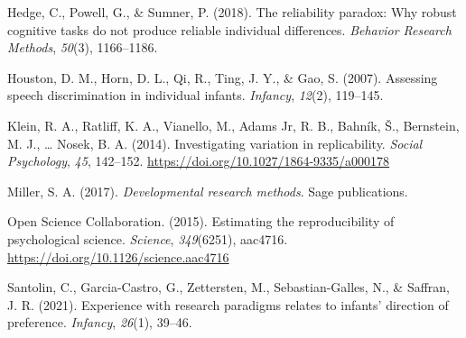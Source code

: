 \documentclass[
  english,
  man,floatsintext]{apa6}
\newlength{\cslhangindent}
\newlength{\cslentryspacingunit} %
\newenvironment{CSLReferences}[2] %
 {%
  \setlength{\parindent}{0pt}
  \ifodd #1
  \let\oldpar\par
  \def\par{\hangindent=\cslhangindent\oldpar}
  \fi
  \setlength{\parskip}{#2\cslentryspacingunit}
 }%
 {}
\begin{document}
\begin{CSLReferences}{1}{0}
\leavevmode{}%
Hedge, C., Powell, G., \& Sumner, P. (2018). The reliability paradox: Why robust cognitive tasks do not produce reliable individual differences. \emph{Behavior Research Methods}, \emph{50}(3), 1166--1186.

\leavevmode{}%
Houston, D. M., Horn, D. L., Qi, R., Ting, J. Y., \& Gao, S. (2007). Assessing speech discrimination in individual infants. \emph{Infancy}, \emph{12}(2), 119--145.

\leavevmode{}%
Klein, R. A., Ratliff, K. A., Vianello, M., Adams Jr, R. B., Bahník, Š., Bernstein, M. J., \ldots{} Nosek, B. A. (2014). Investigating variation in replicability. \emph{Social Psychology}, \emph{45}, 142--152. \url{https://doi.org/10.1027/1864-9335/a000178}

\leavevmode{}%
Miller, S. A. (2017). \emph{Developmental research methods}. Sage publications.

\leavevmode{}%
Open Science Collaboration. (2015). Estimating the reproducibility of psychological science. \emph{Science}, \emph{349}(6251), aac4716. \url{https://doi.org/10.1126/science.aac4716}

\leavevmode{}%
Santolin, C., Garcia-Castro, G., Zettersten, M., Sebastian-Galles, N., \& Saffran, J. R. (2021). Experience with research paradigms relates to infants' direction of preference. \emph{Infancy}, \emph{26}(1), 39--46.

\end{CSLReferences}

\endgroup
\end{document}
